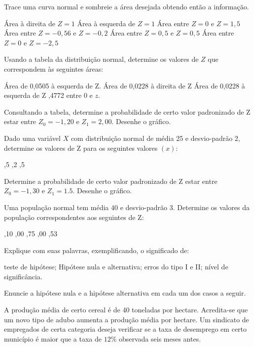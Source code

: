 \documentclass{report}
\begin{document}
\begin{Exercise}

\Question Trace uma curva normal e sombreie a área desejada obtendo então a informação.
\begin{tasks}
\task Área à direita de $Z = 1$
\task Área à esquerda de $Z = 1$
\task Área entre $Z = 0$ e $Z = 1,5$
\task Área entre $Z = -0,56$ e $Z = -0,2$
\task Área entre $Z = 0,5$ e $Z = 0,5$
\task Área entre $Z = 0$ e $Z = -2,5$
\end{tasks} 

\Question Usando a tabela da distribuição normal, determine os valores de $Z$ que correspondem às seguintes áreas:
\begin{tasks}
\task Área de 0,0505 à esquerda de Z.
\task Área de 0,0228 à direita de Z
\task Área de 0,0228 à esquerda de Z
,4772 entre 0 e $z.$
\end{tasks} 

\Question Consultando a tabela, determine a probabilidade de certo valor padronizado de Z estar entre $Z_{0} = -1,20$ e $Z_{1} = 2,00$. Desenhe o gráfico.

\Question Dado uma variável $X$ com distribuição normal de média 25 e desvio-padrão 2, determine os valores de Z para os seguintes valores $(x):$
\begin{tasks}
,5
,2
,5
\end{tasks}

\Question Determine a probabilidade de certo valor padronizado de Z estar entre $Z_{0} = -1,30$ e $Z_{1}=1.5$. Desenhe o gráfico.

\Question Uma população normal tem média 40 e desvio-padrão 3. Determine os valores da população correspondentes aos seguintes de Z:
\begin{tasks}
,10
,00
,75
,00
,53
\end{tasks}

\newpage

\Question Explique com suas palavras, exemplificando, o significado de:
\begin{tasks}
\task teste de hipótese;
\task Hipótese nula e alternativa;
\task erros do tipo I e II; 
\task nível de significância.
\end{tasks}

\Question Enuncie a hipótese nula e a hipótese alternativa em cada um dos casos a seguir.
\begin{tasks}
\task A produção média de certo cereal é de 40 toneladas por hectare. Acredita-se que um novo tipo de adubo aumenta a produção média por hectare.
\task Um sindicato de empregados de certa categoria deseja verificar se a taxa de desemprego em certo município é maior que a taxa de $12\%$ observada seis meses antes.
\end{tasks}


\end{Exercise}
\end{document}
